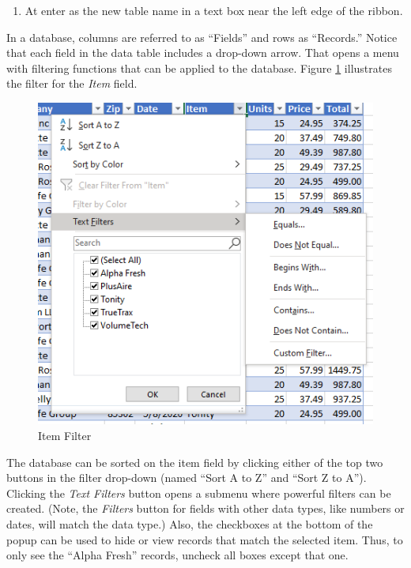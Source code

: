 \begin{enumbox}
	\begin{enumerate}
		\item At  enter  as the new table name in a text box near the left edge of the ribbon.
	\end{enumerate}
\end{enumbox}
	
In a database, columns are referred to as ``Fields'' and rows as ``Records.'' Notice that each field in the data table includes a drop-down arrow. That opens a menu with filtering functions that can be applied to the database. Figure \ref{09:fig12} illustrates the filter for the \textit{Item} field.

\begin{figure}[H]
	\centering
	\includegraphics[width=\maxwidth{.95\linewidth}]{gfx/ch09_fig12}
	\caption{Item Filter}
	\label{09:fig12}
\end{figure}

The database can be sorted on the item field by clicking either of the top two buttons in the filter drop-down (named ``Sort A to Z'' and ``Sort Z to A''). Clicking the \textit{Text Filters} button opens a submenu where powerful filters can be created. (Note, the \textit{Filters} button for fields with other data types, like numbers or dates, will match the data type.) Also, the checkboxes at the bottom of the popup can be used to hide or view records that match the selected item. Thus, to only see the ``Alpha Fresh'' records, uncheck all boxes except that one.

